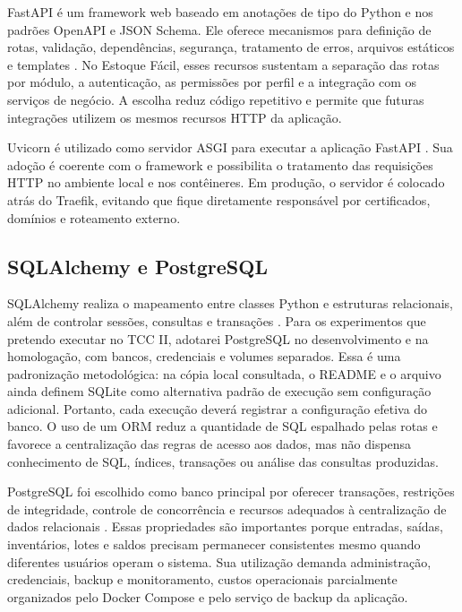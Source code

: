 FastAPI é um framework web baseado em anotações de tipo do Python e nos padrões OpenAPI e JSON Schema. Ele oferece mecanismos para definição de rotas, validação, dependências, segurança, tratamento de erros, arquivos estáticos e templates \cite{FastAPIDocs}. No Estoque Fácil, esses recursos sustentam a separação das rotas por módulo, a autenticação, as permissões por perfil e a integração com os serviços de negócio. A escolha reduz código repetitivo e permite que futuras integrações utilizem os mesmos recursos HTTP da aplicação.

Uvicorn é utilizado como servidor ASGI para executar a aplicação FastAPI \cite{UvicornDocs}. Sua adoção é coerente com o framework e possibilita o tratamento das requisições HTTP no ambiente local e nos contêineres. Em produção, o servidor é colocado atrás do Traefik, evitando que fique diretamente responsável por certificados, domínios e roteamento externo.

\subsection{SQLAlchemy e PostgreSQL}

SQLAlchemy realiza o mapeamento entre classes Python e estruturas relacionais, além de controlar sessões, consultas e transações \cite{SQLAlchemyDocs}. Para os experimentos que pretendo executar no TCC II, adotarei PostgreSQL no desenvolvimento e na homologação, com bancos, credenciais e volumes separados. Essa é uma padronização metodológica: na cópia local consultada, o README e o arquivo  ainda definem SQLite como alternativa padrão de execução sem configuração adicional. Portanto, cada execução deverá registrar a configuração efetiva do banco. O uso de um ORM reduz a quantidade de SQL espalhado pelas rotas e favorece a centralização das regras de acesso aos dados, mas não dispensa conhecimento de SQL, índices, transações ou análise das consultas produzidas.

PostgreSQL foi escolhido como banco principal por oferecer transações, restrições de integridade, controle de concorrência e recursos adequados à centralização de dados relacionais \cite{PostgreSQLDocs}. Essas propriedades são importantes porque entradas, saídas, inventários, lotes e saldos precisam permanecer consistentes mesmo quando diferentes usuários operam o sistema. Sua utilização demanda administração, credenciais, backup e monitoramento, custos operacionais parcialmente organizados pelo Docker Compose e pelo serviço de backup da aplicação.

